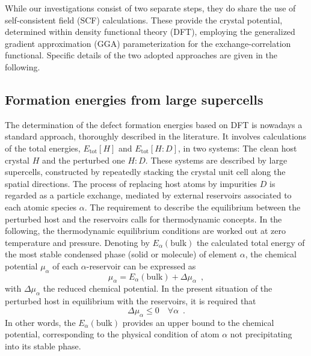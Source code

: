 \documentclass[aps,prb,twocolumn,superscriptaddress,showpacs]{revtex4}
\begin{document}
While our investigations consist of two separate steps, 
they do share the use of self-consistent field (SCF)
calculations. These provide the crystal potential,
determined within density functional theory (DFT),
employing the generalized gradient
approximation (GGA) parameterization for 
the exchange-correlation functional.\cite{PeBu96}
Specific details of the two adopted approaches
are given in the following.

\subsection{Formation energies from large supercells}

The determination of the defect formation energies based on 
DFT is nowadays a standard approach, thoroughly described 
in the literature.\cite{VdWN04,ZWZ97,SDM16}  
It involves calculations of the 
total energies, $E_{\text{tot}}[H]$ and $E_{\text{tot}}[H:D]$,
in two systems: The clean host crystal $H$ and the
perturbed one $H:D$. 
These systems are described by large supercells, constructed
by repeatedly stacking the crystal unit cell along 
the spatial directions. The process of replacing host
atoms by impurities $D$ is regarded as a
particle exchange, mediated by 
external reservoirs associated to each atomic species $\alpha$.
The requirement to describe the equilibrium between the perturbed
host and the reservoirs calls for thermodynamic concepts. In the
following, the thermodynamic equilibrium conditions are worked
out at zero temperature and pressure. Denoting by 
$E_\alpha(\text{bulk})$ the calculated total energy of 
the most stable condensed phase (solid or molecule) of 
element $\alpha$, the chemical potential $\mu_\alpha$
of each $\alpha$-reservoir can be expressed as
\begin{equation}
  \label{MuChemIntro}
  \mu_\alpha=E_\alpha(\text{bulk})+\Delta\mu_\alpha\enspace,
\end{equation}
with $\Delta\mu_\alpha$ the reduced chemical potential. In the present
situation of the perturbed host in equilibrium with the reservoirs, it
is required that
\begin{equation}
  \label{DelMuUp}
  \Delta\mu_\alpha\leq 0 \quad\forall\alpha\enspace.
\end{equation}
In other words, the $E_\alpha(\text{bulk})$ provides 
an upper bound to the chemical potential, corresponding to the 
physical condition of atom $\alpha$ not precipitating into its 
stable phase.
\end{document}
